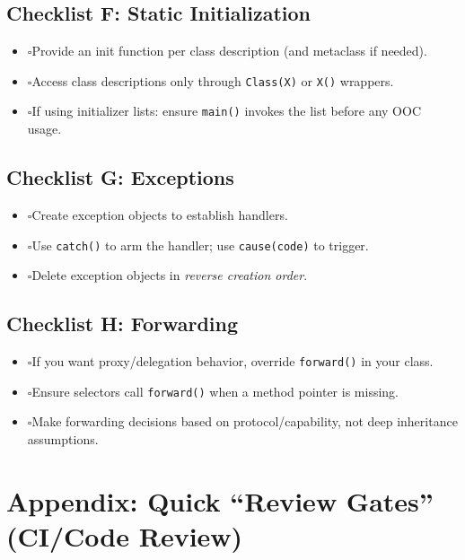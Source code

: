 \documentclass[11pt]{article}
\newcommand{\cb}{\(\square\)}
\begin{document}
\subsection{Checklist F: Static Initialization}

\begin{itemize}
  \item \cb Provide an init function per class description (and metaclass if needed).
  \item \cb Access class descriptions only through \texttt{Class(X)} or \texttt{X()} wrappers.
  \item \cb If using initializer lists: ensure \texttt{main()} invokes the list before any OOC usage.
\end{itemize}

\subsection{Checklist G: Exceptions}

\begin{itemize}
  \item \cb Create exception objects to establish handlers.
  \item \cb Use \texttt{catch()} to arm the handler; use \texttt{cause(code)} to trigger.
  \item \cb Delete exception objects in \emph{reverse creation order}.
\end{itemize}

\subsection{Checklist H: Forwarding}

\begin{itemize}
  \item \cb If you want proxy/delegation behavior, override \texttt{forward()} in your class.
  \item \cb Ensure selectors call \texttt{forward()} when a method pointer is missing.
  \item \cb Make forwarding decisions based on protocol/capability, not deep inheritance assumptions.
\end{itemize}

\section{Appendix: Quick ``Review Gates'' (CI/Code Review)}
\end{document}
